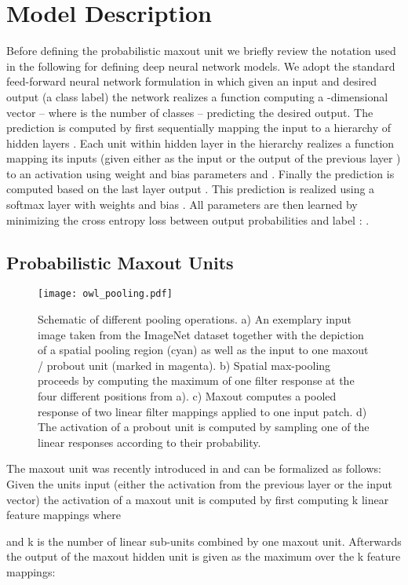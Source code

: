 \documentclass{article} \pdfoutput=1
\begin{document}
\section{Model Description}
Before defining the probabilistic maxout unit we briefly review the
notation used in the following for defining deep neural network
models. We adopt the standard feed-forward neural network formulation
in which given an input  and desired output  (a
class label) the network realizes a function computing a
-dimensional vector  -- where  is the number of
classes -- predicting the desired output.  The prediction is computed
by first sequentially mapping the input to a hierarchy of  hidden
layers . Each unit
 within hidden layer  in the hierarchy
realizes a function  mapping its inputs  (given either as the input
 or the output of the previous layer ) to an
activation using weight and bias parameters  and
. Finally the prediction is computed based on the last
layer output . This prediction is realized using a
softmax layer  with weights  and bias
. All parameters  are then learned by minimizing the
cross entropy loss between output probabilities  and label
 : .

\subsection{Probabilistic Maxout Units}
\begin{figure}
\centering
\texttt{[image: owl\_pooling.pdf]}
\caption{Schematic of different pooling
  operations. a) An exemplary input image taken from the ImageNet
  dataset together with the depiction of a spatial pooling region (cyan) as well as
  the input to one maxout / probout unit (marked in magenta). b)
  Spatial max-pooling proceeds by computing the maximum of one filter
  response at the four different positions from a). c) Maxout computes
  a pooled response of two linear filter mappings applied to
  one input patch. d) The activation of a probout unit is computed by
  sampling one of the linear responses according to their probability.}
\label{pooling_fig}
\end{figure}


The maxout unit was recently introduced in \cite{Goodfellow2013} and can be
formalized as follows: Given the units input  (either the activation from the previous
layer or the input vector) the activation of a maxout unit is
computed by first computing k linear
feature mappings  where

and k is the number of linear sub-units combined by one maxout unit.
Afterwards the output  of the maxout hidden unit is given
as the maximum over the k feature mappings:
\end{document}
